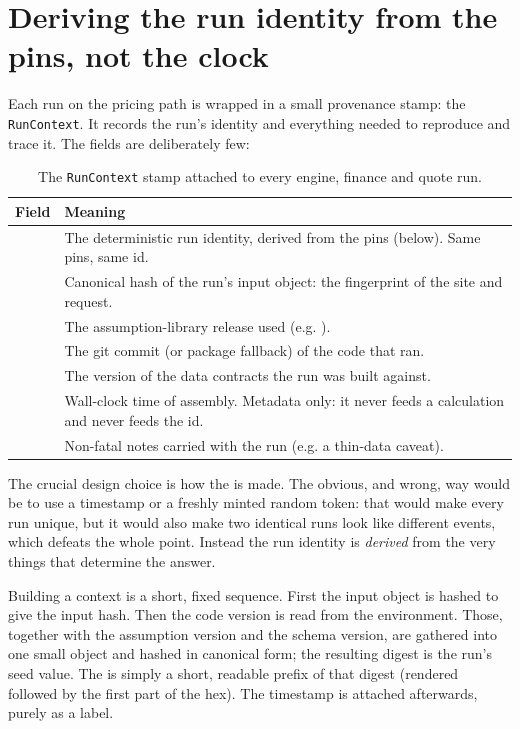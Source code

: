 \section{Deriving the run identity from the pins, not the clock}

Each run on the pricing path is wrapped in a small provenance stamp: the \texttt{RunContext}. It records the run's identity and everything needed to reproduce and trace it. The fields are deliberately few:

\begin{table}[H]
\centering
\caption{The \texttt{RunContext} stamp attached to every engine, finance and quote run.}
\label{tab:runcontext}
\small\sffamily
\begin{tabularx}{\textwidth}{@{}l L@{}}
\toprule
\textbf{Field} & \textbf{Meaning} \\
\midrule
{} & The deterministic run identity, derived from the pins (below). Same pins, same id. \\
 & Canonical hash of the run's input object: the fingerprint of the site and request. \\
 & The assumption-library release used (e.g. ). \\
 & The git commit (or package fallback) of the code that ran. \\
 & The version of the data contracts the run was built against. \\
 & Wall-clock time of assembly. Metadata only: it never feeds a calculation and never feeds the id. \\
 & Non-fatal notes carried with the run (e.g. a thin-data caveat). \\
\bottomrule
\end{tabularx}
\end{table}

The crucial design choice is how the  is made. The obvious, and wrong, way would be to use a timestamp or a freshly minted random token: that would make every run unique, but it would also make two identical runs look like different events, which defeats the whole point. Instead the run identity is \emph{derived} from the very things that determine the answer.

Building a context is a short, fixed sequence. First the input object is hashed to give the input hash. Then the code version is read from the environment. Those, together with the assumption version and the schema version, are gathered into one small object and hashed in canonical form; the resulting digest is the run's seed value. The  is simply a short, readable prefix of that digest (rendered \,followed by the first part of the hex). The timestamp is attached afterwards, purely as a label.

